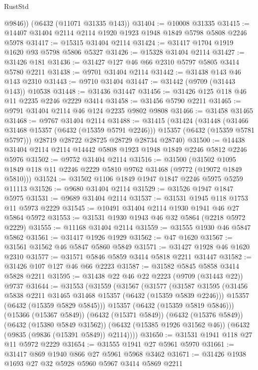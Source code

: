\begin{lexlean}{RustStd}
\begin{coremodule}
        @9846))
    (@6432 (@11071 @31335 @143))
@31404 := @10008 @31335
@31415 := @14407 @31404 @2114 @2114 @1920 @1923 @1948 @1849 @5798 @5808 @2246 @5978
@31417 := @15315 @31404 @2114
@31424 := @31417 @1704 @1919 @1620 @93 @5798 @5806 @5327
@31426 := @15328 @31404 @2114
@31427 := @31426 @181
@31436 := @31427 @127 @46 @66 @2310 @5797 @5805 @3414 @5780 @2211
@31438 := @9701 @31404 @2114
@31442 := @31438 @143 @46 @143 @2310
@31443 := @9710 @31404
@31447 := @31442 (@9709 (@31443 @143)) @10538
@31448 := @31436 @31447
@31456 := @31426 @125 @118 @46 @11 @2235 @2246 @2229 @3414
@31458 := @31456 @5790 @2211
@31465 := @9791 @31404 @2114 @46 @124 @2235 @9802 @9808
@31466 := @31458 @31465
@31468 := @9767 @31404 @2114
@31488 := @31415
    (@31424
      (@31448
        (@31466 @31468 @15357 (@6432 (@15359 @5791 @2246)))
        @15357
        (@6432 (@15359 @5781 @5797)))
      @28719
      @28722
      @28725
      @28729
      @28734
      @28740)
@31500 := @14438 @31404 @2114 @2114 @14442 @5808 @1923 @1948 @1849 @2246 @5812 @2246 @5976
@31502 := @9752 @31404 @2114
@31516 := @31500
    (@31502 @1095 @1849 @118 @11 @2246 @2229 @5810 @9762 @31468 (@9772 (@19072 @1849 @5810)))
@31524 := @31502 @1106 @1849 @1947 @1847 @2246 @5975 @5259 @11113
@31526 := @9680 @31404 @2114
@31529 := @31526 @1947 @1847 @5975
@31531 := @9689 @31404 @2114
@31537 := @31531 @1945 @118 @1753 @11 @5973 @2229
@31545 := @10491 @31404 @2114 @1930 @1941 @46 @27 @5864 @5972
@31553 := @31531 @1930 @1943 @46 @32 @5864 (@2218 @5972 @2229)
@31555 := @11168 @31404 @2114
@31559 := @31555 @1930 @46 @5847 @5862
@31561 := @31417 @1926 @1929
@31562 := @47 @1620
@31567 := @31561 @31562 @46 @5847 @5860 @5849
@31571 := @31427 @1928 @46 @1620 @2310
@31577 := @31571 @5846 @5859 @3414 @5818 @2211 @31447
@31582 := @31426 @107 @127 @46 @66 @2223
@31587 := @31582 @5845 @5858 @3414 @5828 @2211
@31595 := @31438 @22 @46 @22 @2223 (@9709 (@31443 @22)) @9737
@31644 := @31553
    (@31559
      (@31567
        (@31577
          (@31587
            @31595
            (@31456 @5838 @2211 @31465 @31468 @15357 (@6432 (@15359 @5839 @2246)))
            @15357
            (@6432 (@15359 @5829 @5845)))
          @15357
          (@6432 (@15359 @5819 @5846)))
        (@15366 (@15367 @5849))
        (@6432 (@15371 @5849))
        (@6432 (@15376 @5849))
        (@6432 (@15380 @5849 @31562))
        (@6432 (@15385 @1926 @31562 @46))
        (@6432 (@9835 (@9836 (@15391 @5849)) @2114))))
@31650 := @31531 @1941 @118 @27 @11 @5972 @2229
@31654 := @31555 @1941 @27 @5961 @5970
@31661 := @31417 @869 @1940 @866 @27 @5961 @5968 @3462
@31671 := @31426 @1938 @1693 @27 @32 @5928 @5960 @5967 @3414 @5869 @2211

\end{coremodule}
\end{lexlean}

